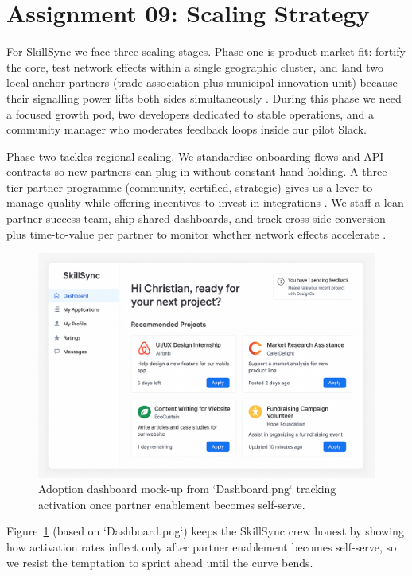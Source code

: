 \section*{Assignment 09: Scaling Strategy}

For SkillSync we face three scaling stages. Phase one is product-market fit: fortify the core, test network effects within a single geographic cluster, and land two local anchor partners (trade association plus municipal innovation unit) because their signalling power lifts both sides simultaneously \citep{Choudary2016,Reillier2017}. During this phase we need a focused growth pod, two developers dedicated to stable operations, and a community manager who moderates feedback loops inside our pilot Slack.

Phase two tackles regional scaling. We standardise onboarding flows and API contracts so new partners can plug in without constant hand-holding. A three-tier partner programme (community, certified, strategic) gives us a lever to manage quality while offering incentives to invest in integrations \citep{HagiuWright2013}. We staff a lean partner-success team, ship shared dashboards, and track cross-side conversion plus time-to-value per partner to monitor whether network effects accelerate \citep{ShapiroVarian1999}.

\begin{figure}[h]
  \centering
  \includegraphics[width=0.75\linewidth]{figures/opgave09/Dashboard.png}
  \caption{Adoption dashboard mock-up from `Dashboard.png` tracking activation once partner enablement becomes self-serve.}
  \label{fig:scaling-dashboard}
\end{figure}

Figure~\ref{fig:scaling-dashboard} (based on `Dashboard.png`) keeps the SkillSync crew honest by showing how activation rates inflect only after partner enablement becomes self-serve, so we resist the temptation to sprint ahead until the curve bends.

